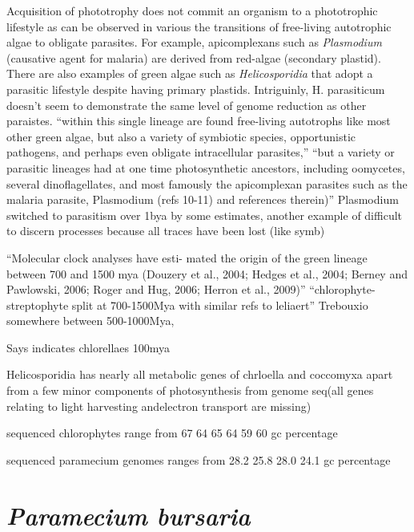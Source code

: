 Acquisition of phototrophy does not commit an organism to a phototrophic lifestyle
as can be observed in various the transitions of free-living autotrophic algae 
to obligate parasites.  For example, apicomplexans such as \textit{Plasmodium} 
(causative agent for malaria) are derived from red-algae (secondary plastid).
There are also examples of green algae such as \textit{Helicosporidia} that 
adopt a parasitic lifestyle despite having primary plastids. 
Intriguinly, H. parasiticum doesn't seem to demonstrate the same level of
genome reduction as other paraistes.\citep{Pombert2014}
``within this single lineage are found free-living autotrophs like most
other green algae, but also a variety of symbiotic species,
opportunistic pathogens, and perhaps even obligate intracellular
parasites,''
``but a variety or parasitic lineages
had at one time photosynthetic ancestors, including oomycetes,
several dinoflagellates, and most famously the apicomplexan
parasites such as the malaria parasite, Plasmodium (refs 10-11)
and references therein)''
\citep{Pombert2014}
Plasmodium switched to parasitism over 1bya by some estimates, another example
of difficult to discern processes because all traces have been lost (like symb)



``Molecular clock analyses have esti- mated the origin of the green lineage between 700 and 1500 mya (Douzery et al., 2004; Hedges et al., 2004; Berney and Pawlowski, 2006; Roger and Hug, 2006; Herron et al., 2009)''
\citep{Leliaert2012}
``chlorophyte-streptophyte split at 700-1500Mya with similar refs to leliaert'' \citep{DeWever2009}
Trebouxio somewhere between 500-1000Mya, \citep{DeWever2009}



Says \citep{DeWever2009} indicates chlorellaes 100mya \citep{Pombert2014}

Helicosporidia has nearly all metabolic genes of chrloella and coccomyxa apart from
a few minor components of photosynthesis \citep{Pombert2014} from genome seq(all genes relating to light harvesting andelectron transport are missing)




sequenced chlorophytes range from  67 64 65 64 59 60 gc percentage \citep{Blanc2010a}

sequenced paramecium genomes ranges from 28.2 25.8 28.0 24.1 gc percentage \citep{McGrath2014}

\section{\textit{Paramecium bursaria}}

